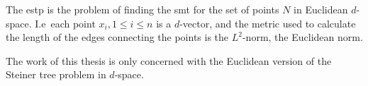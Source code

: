 The \gls{estp} is the problem of finding the \gls{smt} for the set of points $N$
in Euclidean $d$-space. I.e\ each point $x_{i}, 1 \le i \le n$ is a $d$-vector,
and the metric used to calculate the length of the edges connecting the points
is the $L^2$-norm, the Euclidean norm.

The work of this thesis is only concerned with the Euclidean version of the
Steiner tree problem in $d$-space.

\endChapter{}

